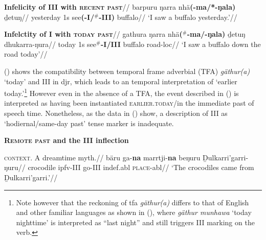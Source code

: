 \a\begingl\glpreamble \textbf{Infelicity of \gls{III} with \textsc{recent past}}//
\gla barpuru ŋarra nhä\textbf{(-ma/*-ŋala)} ḏetuŋ//
\glb yesterday 1s see\textbf{(-\gls{I}/$^\#$-\gls{III})} buffalo//
\glft`I saw a buffalo yesterday.'\trailingcitation[MD 20180802]//\endgl

\a\begingl\glpreamble\textbf{ Infelctity of \gls{I} with \textsc{today past}}//
\gla gathura ŋarra nhä\textbf{($^\#$-ma/-ŋala)} ḏetuŋ dhukarra-ŋura//
\glb today 1s see\textbf{$ ^\# $-\gls{I}/\gls{III}} buffalo road-\gls{loc}//
\glft `I saw a buffalo down the road today'\trailingcitation{[MD 20180802]}//
\endgl
\xe

\noindent() shows the compatibility between temporal frame adverbial (TFA) \textit{gäthur(a)} `today' and \gls{III} in \gls{djr}, which leads to an temporal interpretation of `earlier today.'\footnote{Note however that the reckoning of \gls{tfa} \textit{gäthur(a)} differs to that of English and other familiar languages as shown in (), where \textit{gäthur munhawa} `today nighttime' is interpreted as ``last night'' and still triggers \gls{III} marking on the verb.} However even in the absence of a \gls{TFA}, the event described in () is interpreted as having been instantiated \textsc{earlier.today}/in the immediate past of speech time. Nonetheless, as the data in (\nextx) show, a description of \gls{III} as `hodiernal/same-day past' tense marker is inadequate.


\pex\textbf{\textsc{Remote past} and the \gls{III} inflection}


\a\begingl\glpreamble\textsc{context.} A dreamtime myth.//
\gla bäru ga-\textbf{na} marrtji-\textbf{na} beŋuru Ḏulkarri'garri-ŋuru//
\glb crocodile \gls{ipfv}-\gls{III} go-\gls{III} \gls{indef}.\gls{abl} \textsc{place}-\gls{abl}//
\glft`The crocodiles came from Ḏulkarri'garri.'//\endgl

